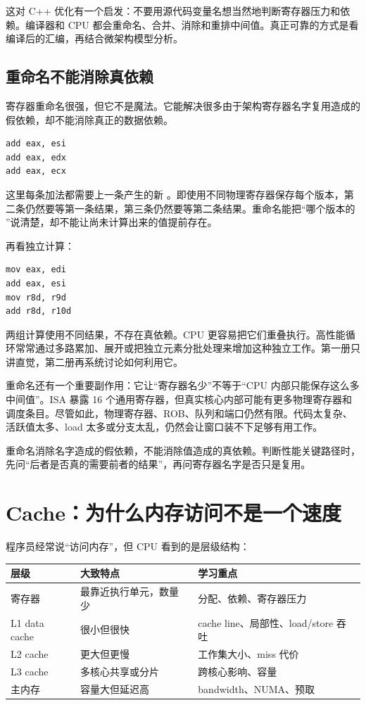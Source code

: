 这对 C++ 优化有一个启发：不要用源代码变量名想当然地判断寄存器压力和依赖。编译器和 CPU 都会重命名、合并、消除和重排中间值。真正可靠的方式是看编译后的汇编，再结合微架构模型分析。

\subsection{重命名不能消除真依赖}

寄存器重命名很强，但它不是魔法。它能解决很多由于架构寄存器名字复用造成的假依赖，却不能消除真正的数据依赖。

\begin{lstlisting}
add eax, esi
add eax, edx
add eax, ecx
\end{lstlisting}

这里每条加法都需要上一条产生的新 。即使用不同物理寄存器保存每个版本，第二条仍然要等第一条结果，第三条仍然要等第二条结果。重命名能把“哪个版本的 ”说清楚，却不能让尚未计算出来的值提前存在。

再看独立计算：

\begin{lstlisting}
mov eax, edi
add eax, esi
mov r8d, r9d
add r8d, r10d
\end{lstlisting}

两组计算使用不同结果，不存在真依赖。CPU 更容易把它们重叠执行。高性能循环常常通过多路累加、展开或把独立元素分批处理来增加这种独立工作。第一册只讲直觉，第二册再系统讨论如何利用它。

重命名还有一个重要副作用：它让“寄存器名少”不等于“CPU 内部只能保存这么多中间值”。ISA 暴露 16 个通用寄存器，但真实核心内部可能有更多物理寄存器和调度条目。尽管如此，物理寄存器、ROB、队列和端口仍然有限。代码太复杂、活跃值太多、load 太多或分支太乱，仍然会让窗口装不下足够有用工作。

\begin{keyidea}
重命名消除名字造成的假依赖，不能消除值造成的真依赖。判断性能关键路径时，先问“后者是否真的需要前者的结果”，再问寄存器名字是否只是复用。
\end{keyidea}

\section{Cache：为什么内存访问不是一个速度}

程序员经常说``访问内存''，但 CPU 看到的是层级结构：

\begin{center}
\begin{tabular}{lll}
\toprule
层级 & 大致特点 & 学习重点 \\
\midrule
寄存器 & 最靠近执行单元，数量少 & 分配、依赖、寄存器压力 \\
L1 data cache & 很小但很快 & cache line、局部性、load/store 吞吐 \\
L2 cache & 更大但更慢 & 工作集大小、miss 代价 \\
L3 cache & 多核心共享或分片 & 跨核心影响、容量 \\
主内存 & 容量大但延迟高 & bandwidth、NUMA、预取 \\
\bottomrule
\end{tabular}
\end{center}

